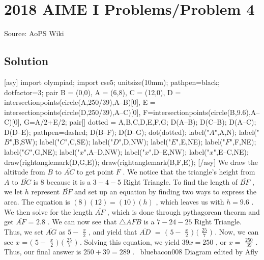 \documentclass[12pt]{article}
\begin{document}
\section*{{2018 AIME I Problems/Problem 4}}
Source: AoPS Wiki

\subsection*{Solution}
[asy] import olympiad; import cse5; unitsize(10mm); pathpen=black; dotfactor=3; pair B = (0,0), A = (6,8), C = (12,0), D = intersectionpoints(circle(A,250/39),A--B)[0], E = intersectionpoints(circle(D,250/39),A--C)[0], F=intersectionpoints(circle(B,9.6),A--C)[0], G=A/2+E/2; pair[] dotted = {A,B,C,D,E,F,G}; D(A--B); D(C--B); D(A--C); D(D--E); pathpen=dashed; D(B--F); D(D--G); dot(dotted); label("$A$",A,N); label("$B$",B,SW); label("$C$",C,SE); label("$D$",D,NW); label("$E$",E,NE); label("$F$",F,NE); label("$G$",G,NE); label("$x$",A--D,NW); label("$x$",D--E,NW); label("$x$",E--C,NE); draw(rightanglemark(D,G,E)); draw(rightanglemark(B,F,E)); [/asy] We draw the altitude from $B$ to $\overline{AC}$ to get point $F$ . We notice that the triangle's height from $A$ to $\overline{BC}$ is 8 because it is a $3-4-5$ Right Triangle. To find the length of $\overline{BF}$ , we let $h$ represent $\overline{BF}$ and set up an equation by finding two ways to express the area. The equation is $(8)(12)=(10)(h)$ , which leaves us with $h=9.6$ . We then solve for the length $\overline{AF}$ , which is done through pythagorean theorm and get $\overline{AF}$ = $2.8$ . We can now see that $\triangle AFB$ is a $7-24-25$ Right Triangle. Thus, we set $\overline{AG}$ as $5-$ $\tfrac{x}{2}$ , and yield that $\overline{AD}$ $=$ $($ $5-$ $\tfrac{x}{2}$ $)$ $($ $\tfrac{25}{7}$ $)$ . Now, we can see $x$ = $($ $5-$ $\tfrac{x}{2}$ $)$ $($ $\tfrac{25}{7}$ $)$ . Solving this equation, we yield $39x=250$ , or $x=$ $\tfrac{250}{39}$ . Thus, our final answer is $250+39=\boxed{289}$ . ~bluebacon008 Diagram edited by Afly
\end{document}
